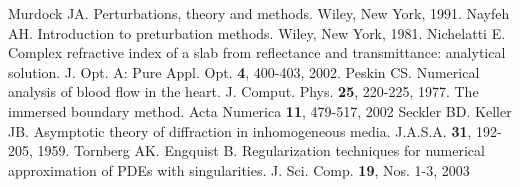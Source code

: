 \documentclass[12pt,twoside]{report}
\begin{document}
\begin{thebibliography}{2d}
Murdock JA. Perturbations, theory and methods. Wiley, New York, 1991.
Nayfeh AH. Introduction to preturbation methods. Wiley, New York, 1981.
Nichelatti E. Complex refractive index of a slab from reflectance and transmittance: analytical solution. J. Opt. A: Pure Appl. Opt. \textbf{4}, 400-403, 2002.
Peskin CS. Numerical analysis of blood flow in the heart. J. Comput. Phys. \textbf{25}, 220-225, 1977.
The immersed boundary method. Acta Numerica \textbf{11}, 479-517, 2002
Seckler BD. Keller JB. Asymptotic theory of diffraction in inhomogeneous media. J.A.S.A. \textbf{31}, 192-205, 1959.  
Tornberg AK. Engquist B. Regularization techniques for numerical approximation of PDEs with singularities. J. Sci. Comp. \textbf{19}, Nos. 1-3, 2003
\end{thebibliography}
\end{document}
